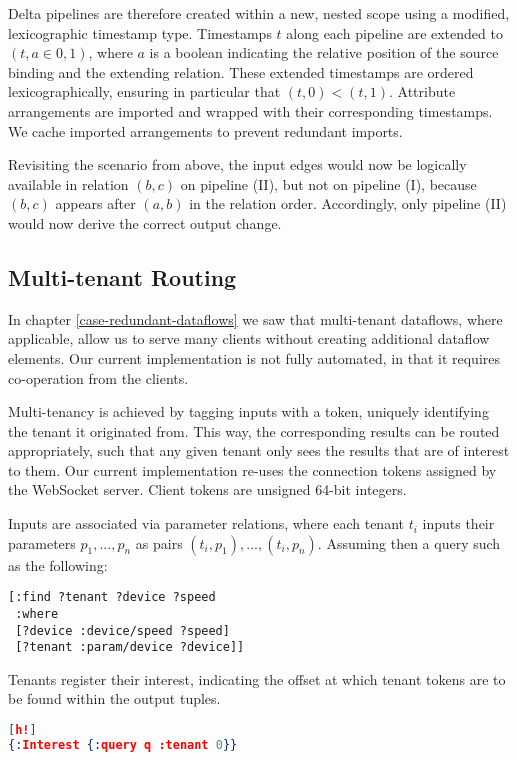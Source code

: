 \documentclass[../index.tex]{subfiles}
\begin{document}
Delta pipelines are therefore created within a new, nested scope using
a modified, lexicographic timestamp type. Timestamps $t$ along each
pipeline are extended to $(t,a \in {0,1})$, where $a$ is a boolean
indicating the relative position of the source binding and the
extending relation. These extended timestamps are ordered
lexicographically, ensuring in particular that $(t,0) <
(t,1)$. Attribute arrangements are imported and wrapped with their
corresponding timestamps. We cache imported arrangements to prevent
redundant imports.

Revisiting the scenario from above, the input edges would now be
logically available in relation $(b,c)$ on pipeline (II), but not on
pipeline (I), because $(b,c)$ appears after $(a,b)$ in the relation
order. Accordingly, only pipeline (II) would now derive the correct
output change.

\subsection{Multi-tenant Routing}

In chapter \ref{case-redundant-dataflows} we saw that multi-tenant
dataflows, where applicable, allow us to serve many clients without
creating additional dataflow elements. Our current implementation is
not fully automated, in that it requires co-operation from the
clients.

Multi-tenancy is achieved by tagging inputs with a token, uniquely
identifying the tenant it originated from. This way, the corresponding
results can be routed appropriately, such that any given tenant only
sees the results that are of interest to them. Our current
implementation re-uses the connection tokens assigned by the WebSocket
server. Client tokens are unsigned 64-bit integers.

Inputs are associated via parameter relations, where each tenant $t_i$
inputs their parameters $p_1, ..., p_n$ as pairs
$(t_i,p_1),...,(t_i,p_n)$. Assuming then a query such as the
following:

\begin{verbatim}
[:find ?tenant ?device ?speed
 :where
 [?device :device/speed ?speed]
 [?tenant :param/device ?device]]
\end{verbatim}

Tenants register their interest, indicating the offset at which tenant
tokens are to be found within the output tuples.

\begin{lstlisting}[language=json][h!]
{:Interest {:query q :tenant 0}}
\end{lstlisting}
\end{document}
